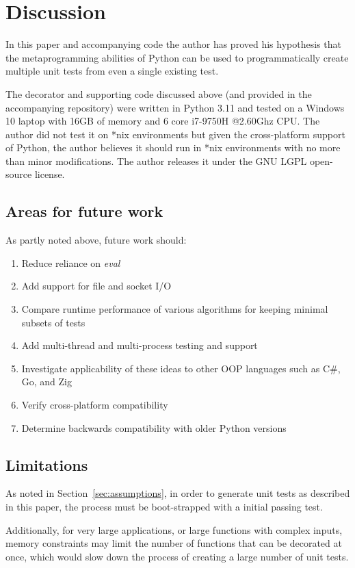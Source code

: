 \section{Discussion}\label{sec:discussion}

In this paper and accompanying code the author
has proved his hypothesis that the metaprogramming abilities of 
Python can be used to programmatically create multiple 
unit tests from even a single existing test.

The decorator and supporting code discussed above
(and provided in the accompanying repository)
were written in Python 3.11 and tested on a 
Windows 10 laptop with 16GB of memory and 6 core i7-9750H @2.60Ghz CPU.
The author did not test it on *nix environments but given the
cross-platform support of Python, the author believes it should run in *nix 
environments with no more than minor modifications. The author releases it
under the GNU LGPL open-source license.

\subsection{Areas for future work}\label{sec:tuning-2}
As partly noted above, future work should: 
\begin{enumerate}
  \item Reduce reliance on \textit{eval}
  \item Add support for file and socket I/O
  \item Compare runtime performance of various algorithms for keeping minimal subsets of tests
  \item Add multi-thread and multi-process testing and support
  \item Investigate applicability of these ideas to other OOP languages such as C\#, Go, and Zig
  \item Verify cross-platform compatibility
  \item Determine backwards compatibility with older Python versions
\end{enumerate}

\subsection{Limitations}\label{sec:limitations}
As noted in Section~\ref{sec:assumptions}, in order to 
generate unit tests as described in this paper, the 
process must be boot-strapped with a initial passing test.

Additionally, for very large applications, or large
functions with complex inputs, memory constraints may 
limit the number of functions that can be decorated at once,
which would slow down the process of creating 
a large number of unit tests.

